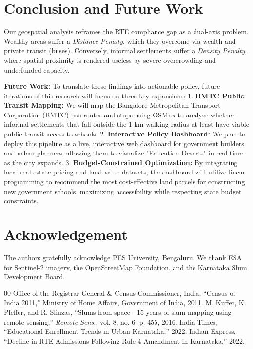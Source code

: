 \documentclass[conference]{IEEEtran}
\begin{document}
\section{Conclusion and Future Work}
Our geospatial analysis reframes the RTE compliance gap as a dual-axis problem. Wealthy areas suffer a \textit{Distance Penalty}, which they overcome via wealth and private transit (buses). Conversely, informal settlements suffer a \textit{Density Penalty}, where spatial proximity is rendered useless by severe overcrowding and underfunded capacity.

\textbf{Future Work:} To translate these findings into actionable policy, future iterations of this research will focus on three key expansions:
1. \textbf{BMTC Public Transit Mapping:} We will map the Bangalore Metropolitan Transport Corporation (BMTC) bus routes and stops using OSMnx to analyze whether informal settlements that fall outside the 1 km walking radius at least have viable public transit access to schools.
2. \textbf{Interactive Policy Dashboard:} We plan to deploy this pipeline as a live, interactive web dashboard for government builders and urban planners, allowing them to visualize "Education Deserts" in real-time as the city expands.
3. \textbf{Budget-Constrained Optimization:} By integrating local real estate pricing and land-value datasets, the dashboard will utilize linear programming to recommend the most cost-effective land parcels for constructing new government schools, maximizing accessibility while respecting state budget constraints.

\section*{Acknowledgement}
The authors gratefully acknowledge PES University, Bengaluru. We thank ESA for Sentinel-2 imagery, the OpenStreetMap Foundation, and the Karnataka Slum Development Board.

\begin{thebibliography}{00}
 Office of the Registrar General \& Census Commissioner, India, ``Census of India 2011,'' Ministry of Home Affairs, Government of India, 2011.
 M. Kuffer, K. Pfeffer, and R. Sliuzas, ``Slums from space—15 years of slum mapping using remote sensing,'' \textit{Remote Sens.}, vol. 8, no. 6, p. 455, 2016.
 India Times, ``Educational Enrollment Trends in Urban Karnataka,'' 2022.
 Indian Express, ``Decline in RTE Admissions Following Rule 4 Amendment in Karnataka,'' 2022.
\end{thebibliography}
\end{document}
